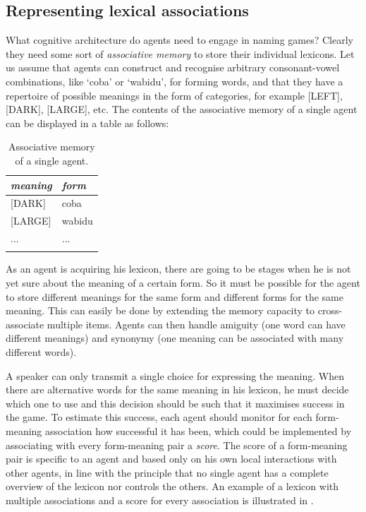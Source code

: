 \subsection{Representing lexical associations}

What cognitive architecture do agents need to engage in naming 
games? Clearly they need some sort of {\itshape associative memory} to
store their individual lexicons.
Let us assume that agents 
can construct and recognise arbitrary consonant-vowel combinations, 
like `coba' or `wabidu', for forming words, and that they 
have a repertoire of possible meanings in the form of 
categories, for example [LEFT], [DARK], [LARGE], etc. 
The contents of the associative memory of a single agent can
be displayed in a table as follows: 

\begin{table}
\begin{center}
\begin{tabular}{ l  l }
\lsptoprule
{\itshape meaning} & {\itshape form} \\ 
\midrule{}
{}[DARK] & coba \\ 
{}[LARGE] & wabidu \\ 
... & ... \\ 
\lspbottomrule
\end{tabular}
\end{center}
\caption{\label{tab:t-mem}Associative memory of a single agent.}
\end{table}
As an agent is acquiring his lexicon, there are going to 
be stages when he is not yet sure about the meaning of 
a certain form. So it must be possible for the agent
to store different 
meanings for the same form and different forms for the
same meaning. This can easily be done by extending the memory capacity
to cross-associate multiple items. Agents can then 
handle amiguity (one word can have different
meanings) and synonymy (one meaning can 
be associated with many different words). 

A speaker can only transmit a single choice for 
expressing the meaning.
When there are alternative words for the same meaning in 
his lexicon, he must decide which one to use and this decision
should be such that it maximises success in the game. 
To estimate this success, 
each agent should monitor for each form-meaning association
how successful it has been, which could be implemented 
by associating with every form-meaning pair 
a {\itshape score}. The score of a form-meaning pair
is specific to an agent and based only on his own 
local interactions with other agents, in line with the 
principle that no single agent has a complete overview of 
the lexicon nor controls the others. An example of 
a lexicon with multiple associations and a score for every 
association is illustrated in . 

